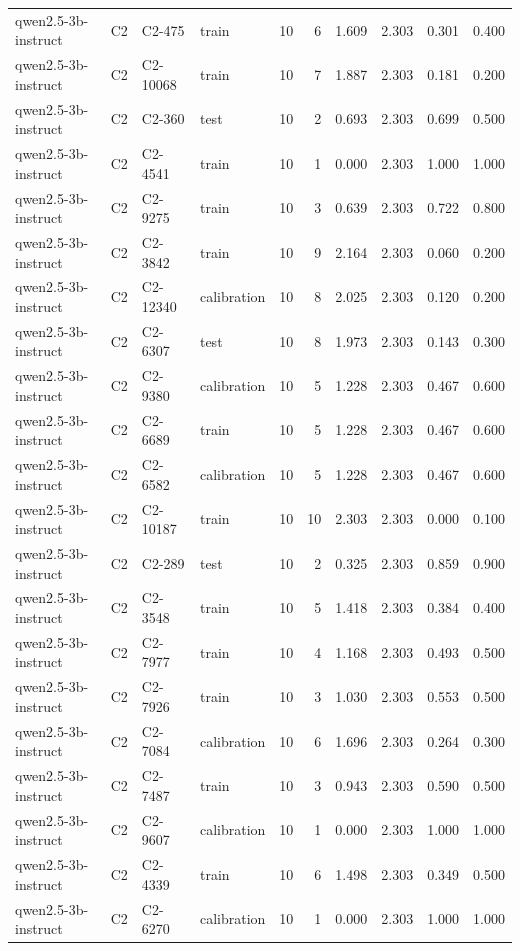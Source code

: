 \begin{table}
\begin{tabular}{llllrrrrrr}
qwen2.5-3b-instruct & C2 & C2-475 & train & 10 & 6 & 1.609 & 2.303 & 0.301 & 0.400 \\
qwen2.5-3b-instruct & C2 & C2-10068 & train & 10 & 7 & 1.887 & 2.303 & 0.181 & 0.200 \\
qwen2.5-3b-instruct & C2 & C2-360 & test & 10 & 2 & 0.693 & 2.303 & 0.699 & 0.500 \\
qwen2.5-3b-instruct & C2 & C2-4541 & train & 10 & 1 & 0.000 & 2.303 & 1.000 & 1.000 \\
qwen2.5-3b-instruct & C2 & C2-9275 & train & 10 & 3 & 0.639 & 2.303 & 0.722 & 0.800 \\
qwen2.5-3b-instruct & C2 & C2-3842 & train & 10 & 9 & 2.164 & 2.303 & 0.060 & 0.200 \\
qwen2.5-3b-instruct & C2 & C2-12340 & calibration & 10 & 8 & 2.025 & 2.303 & 0.120 & 0.200 \\
qwen2.5-3b-instruct & C2 & C2-6307 & test & 10 & 8 & 1.973 & 2.303 & 0.143 & 0.300 \\
qwen2.5-3b-instruct & C2 & C2-9380 & calibration & 10 & 5 & 1.228 & 2.303 & 0.467 & 0.600 \\
qwen2.5-3b-instruct & C2 & C2-6689 & train & 10 & 5 & 1.228 & 2.303 & 0.467 & 0.600 \\
qwen2.5-3b-instruct & C2 & C2-6582 & calibration & 10 & 5 & 1.228 & 2.303 & 0.467 & 0.600 \\
qwen2.5-3b-instruct & C2 & C2-10187 & train & 10 & 10 & 2.303 & 2.303 & 0.000 & 0.100 \\
qwen2.5-3b-instruct & C2 & C2-289 & test & 10 & 2 & 0.325 & 2.303 & 0.859 & 0.900 \\
qwen2.5-3b-instruct & C2 & C2-3548 & train & 10 & 5 & 1.418 & 2.303 & 0.384 & 0.400 \\
qwen2.5-3b-instruct & C2 & C2-7977 & train & 10 & 4 & 1.168 & 2.303 & 0.493 & 0.500 \\
qwen2.5-3b-instruct & C2 & C2-7926 & train & 10 & 3 & 1.030 & 2.303 & 0.553 & 0.500 \\
qwen2.5-3b-instruct & C2 & C2-7084 & calibration & 10 & 6 & 1.696 & 2.303 & 0.264 & 0.300 \\
qwen2.5-3b-instruct & C2 & C2-7487 & train & 10 & 3 & 0.943 & 2.303 & 0.590 & 0.500 \\
qwen2.5-3b-instruct & C2 & C2-9607 & calibration & 10 & 1 & 0.000 & 2.303 & 1.000 & 1.000 \\
qwen2.5-3b-instruct & C2 & C2-4339 & train & 10 & 6 & 1.498 & 2.303 & 0.349 & 0.500 \\
qwen2.5-3b-instruct & C2 & C2-6270 & calibration & 10 & 1 & 0.000 & 2.303 & 1.000 & 1.000 \\

\end{tabular}
\end{table}
